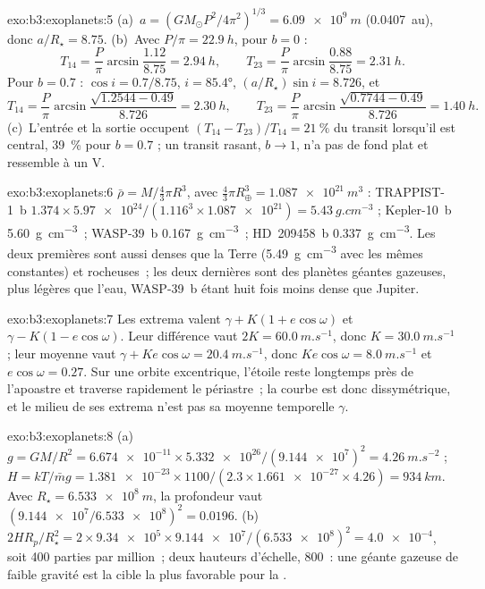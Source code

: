 \begin{solution}{exo:b3:exoplanets:5}
(a)~$a = (GM_\odot P^2/4\pi^2)^{1/3} = \qty{6.09e9}{m}$ (\qty{0.0407}{au}),
donc $a/R_\star = 8.75$. (b)~Avec $P/\pi = \qty{22.9}{h}$, pour $b = 0$ :
\[
T_{14} = \frac P\pi\arcsin\frac{1.12}{8.75} = \qty{2.94}{h}, \qquad
T_{23} = \frac P\pi\arcsin\frac{0.88}{8.75} = \qty{2.31}{h}.
\]
Pour $b = 0.7$ : $\cos i = 0.7/8.75$, $i = \ang{85.4}$, $(a/R_\star)\sin i =
8.726$, et
\[
T_{14} = \frac P\pi\arcsin\frac{\sqrt{1.2544 - 0.49}}{8.726} = \qty{2.30}{h},
\qquad
T_{23} = \frac P\pi\arcsin\frac{\sqrt{0.7744 - 0.49}}{8.726} = \qty{1.40}{h}.
\]
(c)~L'entrée et la sortie occupent $(T_{14} - T_{23})/T_{14} = \qty{21}{\percent}$
du transit lorsqu'il est central, \qty{39}{\percent} pour $b = 0.7$ ; un
transit rasant, $b \to 1$, n'a pas de fond plat et ressemble à un V.
\end{solution}

\begin{solution}{exo:b3:exoplanets:6}
$\bar\rho = M/\tfrac43\pi R^3$, avec $\tfrac43\pi R_\oplus^3 =
\qty{1.087e21}{m^3}$ : TRAPPIST-1~b $1.374\times\num{5.97e24}/(1.116^3\times
\num{1.087e21}) = \qty{5.43}{g.cm^{-3}}$ ; Kepler-10~b
\qty{5.60}{g.cm^{-3}}~; WASP-39~b \qty{0.167}{g.cm^{-3}}~; HD~209458~b
\qty{0.337}{g.cm^{-3}}. Les deux premières sont aussi denses que la Terre
(\qty{5.49}{g.cm^{-3}} avec les mêmes constantes) et rocheuses~; les deux
dernières sont des planètes géantes gazeuses, plus légères que l'eau, WASP-39~b
étant huit fois moins dense que Jupiter.
\end{solution}

\begin{solution}{exo:b3:exoplanets:7}
Les extrema valent $\gamma + K(1 + e\cos\omega)$ et $\gamma - K(1 -
e\cos\omega)$. Leur différence vaut $2K = \qty{60.0}{m.s^{-1}}$, donc $K =
\qty{30.0}{m.s^{-1}}$ ; leur moyenne vaut $\gamma + Ke\cos\omega =
\qty{20.4}{m.s^{-1}}$, donc $Ke\cos\omega = \qty{8.0}{m.s^{-1}}$ et
$e\cos\omega = 0.27$. Sur une orbite excentrique, l'étoile reste longtemps près
de l'apoastre et traverse rapidement le périastre~; la courbe est donc
dissymétrique, et le milieu de ses extrema n'est pas sa moyenne temporelle $\gamma$.
\end{solution}

\begin{solution}{exo:b3:exoplanets:8}
(a)~$g = GM/R^2 = \num{6.674e-11}\times\num{5.332e26}/(\num{9.144e7})^2 =
\qty{4.26}{m.s^{-2}}$ ; $H = kT/\bar m g = \num{1.381e-23}\times1100/(2.3
\times\num{1.661e-27}\times4.26) = \qty{934}{km}$. Avec $R_\star =
\qty{6.533e8}{m}$, la profondeur vaut $(\num{9.144e7}/\num{6.533e8})^2 =
\num{0.0196}$. (b)~$2HR_p/R_\star^2 = 2\times\num{9.34e5}\times
\num{9.144e7}/(\num{6.533e8})^2 = \num{4.0e-4}$, soit 400 parties par million~;
deux hauteurs d'échelle, 800~: une géante gazeuse de faible gravité est la cible la plus favorable
pour la .
\end{solution}

